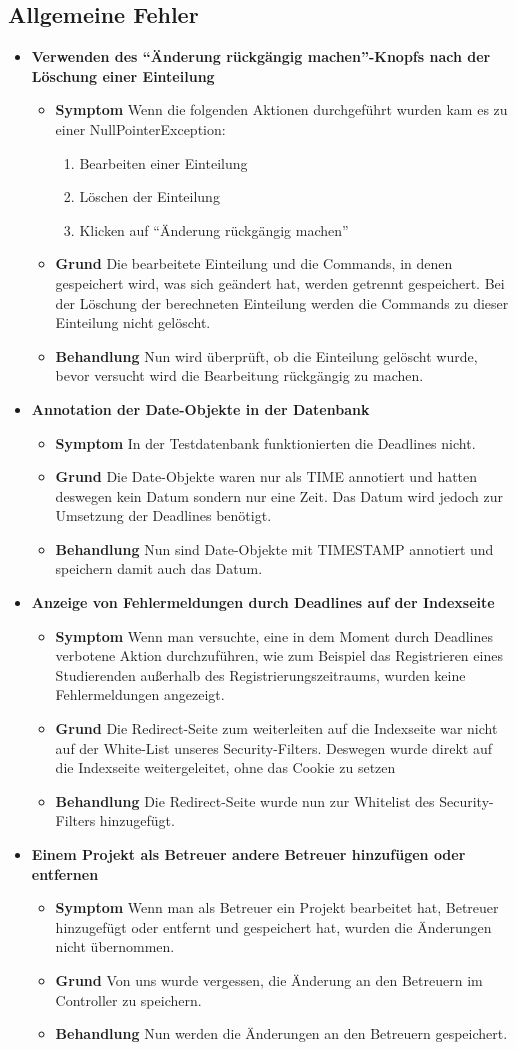 \documentclass[parskip=full]{scrartcl}
\newcommand{\fehler}[4]{\textbf{#1}
 							\begin{itemize}
 							  \item \textbf{Symptom}  #2
 							  \item \textbf{Grund} #3
 							  \item \textbf{Behandlung} #4
 							\end{itemize}}
\newcommand{\code}[1]{{\ttfamily #1}}
\begin{document}
\subsection{Allgemeine Fehler}
\begin{itemize}
  \item \fehler{Verwenden des \enquote{Änderung rückgängig machen}-Knopfs nach
  der Löschung einer Einteilung }{Wenn die folgenden
  Aktionen durchgeführt wurden kam es zu einer \code{NullPointerException}:
\begin{enumerate}
  \item Bearbeiten einer Einteilung
  \item Löschen der Einteilung
  \item Klicken auf \enquote{Änderung rückgängig machen}
\end{enumerate}}{Die bearbeitete Einteilung und die Commands, in denen
gespeichert wird, was sich geändert hat, werden getrennt gespeichert. Bei der
Löschung der berechneten Einteilung werden die Commands zu dieser Einteilung
nicht gelöscht.}{Nun wird überprüft, ob die Einteilung gelöscht wurde, bevor
versucht wird die Bearbeitung rückgängig zu machen.}
\item \fehler{Annotation der Date-Objekte in der Datenbank }{In der %
Testdatenbank funktionierten die Deadlines nicht. }{Die Date-Objekte waren
nur als \code{TIME} annotiert und hatten deswegen kein Datum sondern nur eine Zeit.
Das Datum wird jedoch zur Umsetzung der Deadlines benötigt.}{Nun sind
Date-Objekte mit \code{TIMESTAMP} annotiert und speichern damit auch das Datum.}
\item \fehler{Anzeige von Fehlermeldungen durch Deadlines auf der
Indexseite}{Wenn man versuchte, eine in dem Moment durch Deadlines verbotene
Aktion durchzuführen, wie zum Beispiel das Registrieren eines Studierenden
außerhalb des Registrierungszeitraums, wurden keine Fehlermeldungen
angezeigt.}{Die Redirect-Seite zum weiterleiten auf die Indexseite war nicht
auf der White-List unseres Security-Filters. Deswegen wurde direkt auf die Indexseite
weitergeleitet, ohne das Cookie zu setzen  }{Die Redirect-Seite wurde nun zur
Whitelist des Security-Filters hinzugefügt.}
\item \fehler{Einem Projekt als Betreuer andere Betreuer hinzufügen
oder entfernen}{Wenn man als Betreuer ein Projekt bearbeitet hat, Betreuer
hinzugefügt oder entfernt und gespeichert hat, wurden die Änderungen nicht übernommen.}{Von uns wurde vergessen, die Änderung an den Betreuern im Controller zu speichern.}{Nun werden die Änderungen an den Betreuern gespeichert.}

\end{itemize}
\end{document}
